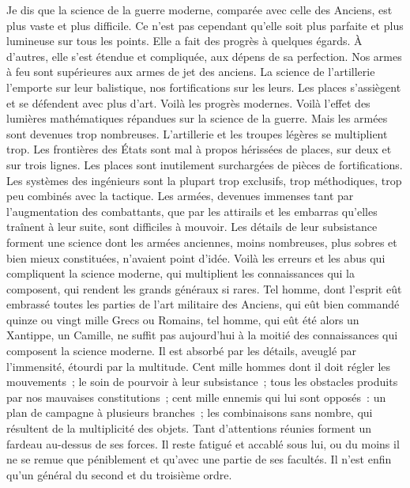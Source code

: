 \documentclass[french,twoside]{book} %
\begin{document}
Je dis que la science de la guerre moderne, comparée avec celle des Anciens, est plus vaste et plus difficile. Ce n’est pas cependant qu’elle soit plus parfaite et plus lumineuse sur tous les points. Elle a fait des progrès à quelques égards. À d’autres, elle s’est étendue et compliquée, aux dépens de sa perfection. Nos armes à feu sont supérieures aux armes de jet des anciens. La science de l’artillerie l’emporte sur leur balistique, nos fortifications sur les leurs. Les places s’assiègent et se défendent avec plus d’art. Voilà les progrès modernes. Voilà l’effet des lumières mathématiques répandues sur la science de la guerre. Mais les armées sont devenues trop nombreuses. L’artillerie et les troupes légères se multiplient trop. Les frontières des États sont mal à propos hérissées de places, sur deux et sur trois lignes. Les places sont inutilement surchargées de pièces de fortifications. Les systèmes des ingénieurs sont la plupart trop exclusifs, trop méthodiques, trop peu combinés avec la tactique. Les armées, devenues immenses tant par l’augmentation des combattants, que par les attirails et les embarras qu’elles traînent à leur suite, sont difficiles à mouvoir. Les détails de leur subsistance forment une science dont les armées anciennes, moins nombreuses, plus sobres et bien mieux constituées, n’avaient point d’idée. Voilà les erreurs et les abus qui compliquent la science moderne, qui multiplient les connaissances qui la composent, qui rendent les grands généraux si rares. Tel homme, dont l’esprit eût embrassé toutes les parties de l’art militaire des Anciens, qui eût bien commandé quinze ou vingt mille Grecs ou Romains, tel homme, qui eût été alors un Xantippe, un Camille, ne suffit pas aujourd’hui à la moitié des connaissances qui composent la science moderne. Il est absorbé par les détails, aveuglé par l’immensité, étourdi par la multitude. Cent mille hommes dont il doit régler les mouvements ; le soin de pourvoir à leur subsistance ; tous les obstacles produits par nos mauvaises constitutions ; cent mille ennemis qui lui sont opposés : un plan de campagne à plusieurs branches ; les combinaisons sans nombre, qui résultent de la multiplicité des objets. Tant d’attentions réunies forment un fardeau au-dessus de ses forces. Il reste fatigué et accablé sous lui, ou du moins il ne se remue que péniblement et qu’avec une partie de ses facultés. Il n’est enfin qu’un général du second et du troisième ordre.\par
\end{document}
